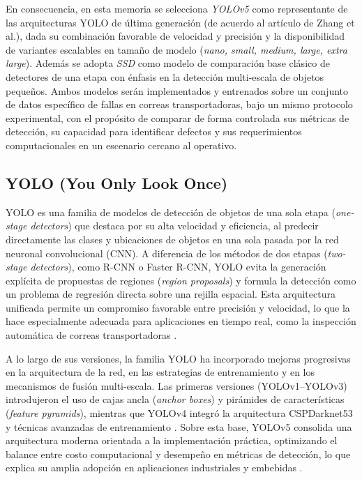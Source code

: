 \par En consecuencia, en esta memoria se selecciona \textit{YOLOv5} como representante de las arquitecturas YOLO de última generación (de acuerdo al artículo de Zhang et al.), dada su combinación favorable de velocidad y precisión y la disponibilidad de variantes escalables en tamaño de modelo (\textit{nano, small, medium, large, extra large}). Además se adopta \textit{SSD} como modelo de comparación base clásico de detectores de una etapa con énfasis en la detección multi-escala de objetos pequeños. Ambos modelos serán implementados y entrenados sobre un conjunto de datos específico de fallas en correas transportadoras, bajo un mismo protocolo experimental, con el propósito de comparar de forma controlada sus métricas de detección, su capacidad para identificar defectos y sus requerimientos computacionales en un escenario cercano al operativo.

\subsection{YOLO (You Only Look Once)}
\label{subsec:yolo}

\par YOLO es una familia de modelos de detección de objetos de una sola etapa (\textit{one-stage detectors}) que destaca por su alta velocidad y eficiencia, al predecir directamente las clases y ubicaciones de objetos en una sola pasada por la red neuronal convolucional (CNN). A diferencia de los métodos de dos etapas (\textit{two-stage detectors}), como R-CNN o Faster R-CNN, YOLO evita la generación explícita de propuestas de regiones (\textit{region proposals}) y formula la detección como un problema de regresión directa sobre una rejilla espacial. Esta arquitectura unificada permite un compromiso favorable entre precisión y velocidad, lo que la hace especialmente adecuada para aplicaciones en tiempo real, como la inspección automática de correas transportadoras \cite{terven2023comprehensive}.\\

\par A lo largo de sus versiones, la familia YOLO ha incorporado mejoras progresivas en la arquitectura de la red, en las estrategias de entrenamiento y en los mecanismos de fusión multi-escala. Las primeras versiones (YOLOv1--YOLOv3) introdujeron el uso de cajas ancla (\textit{anchor boxes}) y pirámides de características (\textit{feature pyramids}), mientras que YOLOv4 integró la arquitectura CSPDarknet53 y técnicas avanzadas de entrenamiento \cite{zhang2021one_stage}. Sobre esta base, YOLOv5 consolida una arquitectura moderna orientada a la implementación práctica, optimizando el balance entre costo computacional y desempeño en métricas de detección, lo que explica su amplia adopción en aplicaciones industriales y embebidas \cite{Jani2023ModelCompressionYOLOv5}.

